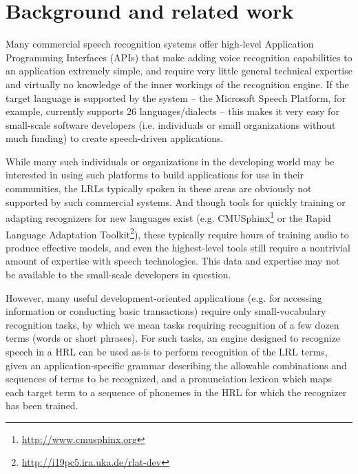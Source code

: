 \documentclass[11pt]{article}
\begin{document}
\section{Background and related work}
\label{sec:background}
Many commercial speech recognition systems offer high-level Application Programming Interfaces (APIs) that make adding voice recognition capabilities to an application 
extremely simple,
and require very little general technical expertise and virtually no knowledge of the inner workings of the recognition engine. If the target language is supported by the system -- the Microsoft Speech Platform, for example, currently supports  
26 languages/dialects \cite{mspsdk} -- this makes it very easy for small-scale software developers (i.e. individuals or small organizations without much funding) to create speech-driven applications. 

While many such individuals or organizations in the developing world may be interested in using such platforms to build applications for use in their communities, the LRLs typically spoken in these areas are obviously not supported by such commercial systems. 
And though tools for quickly training or adapting recognizers for new languages exist (e.g. CMUSphinx\footnote{\url{http://www.cmusphinx.org}} or the Rapid Language Adaptation Toolkit\footnote{\url{http://i19pc5.ira.uka.de/rlat-dev}}), these typically require hours of training audio to produce effective models, and even the highest-level tools still require a nontrivial amount of expertise with speech technologies. This data and expertise may not be available to the small-scale developers in question.

However, many useful development-oriented applications (e.g. for accessing information or conducting basic transactions) require only small-vocabulary recognition tasks, by which we mean 
tasks requiring recognition of 
a few dozen terms (words or short phrases).
For such tasks, 
an engine designed to recognize speech in a HRL
can be used as-is to perform recognition of the LRL terms,
given
an application-specific grammar describing the allowable combinations and sequences of terms to be recognized, and a pronunciation lexicon which maps each target term to a sequence of phonemes in the HRL for which the recognizer has been trained. 
\end{document}

